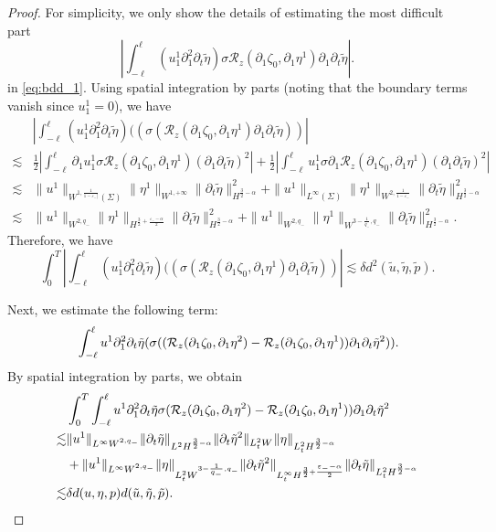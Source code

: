 \documentclass[letterpaper,reqno,10pt,twoside]{amsart}
\theoremstyle{definition}
\theoremstyle{remark}
\def\p{\partial}
\begin{document}
\begin{proof}
			\noindent For simplicity, we only show the details of estimating the most difficult part
			\[
			\left| \int_{-\ell}^{\ell}(u_{1}^{1}\p_{1}^{2}\p_{t}\tilde{\eta})\sigma\mathcal{R}_{z}(\p_{1}\zeta_{0},\p_{1}\eta^{1})\p_{1}\p_{t}\tilde{\eta} \right|.
			\]
			in \eqref{eq:bdd_1}.
			Using spatial integration by parts (noting that the boundary terms vanish since $u_{1}^{1}=0$), we have
			\[
			\begin{aligned}
				&| \int_{-\ell}^{\ell}(u_{1}^{1}\p_{1}^{2}\p_{t}\tilde{\eta})((\sigma(\mathcal{R}_{z}(\p_{1}\zeta_{0},\p_{1}\eta^{1})\p_{1}\p_{t}\tilde{\eta}))|\\
				\lesssim&\frac{1}{2}|\int_{-\ell}^{\ell}\p_{1}u_{1}^{1}\sigma\mathcal{R}_{z}(\p_{1}\zeta_{0},\p_{1}\eta^{1})(\p_{1}\p_{t}\tilde{\eta})^{2}|+\frac{1}{2}|\int_{-\ell}^{\ell}u_{1}^{1}\sigma\p_{1}\mathcal{R}_{z}(\p_{1}\zeta_{0},\p_{1}\eta^{1})(\p_{1}\p_{t}\tilde{\eta})^{2}|\\
				\lesssim&\|u^{1}\|_{W^{1,\frac{1}{1-\varepsilon_{-}]}}(\Sigma)}\|\eta^{1}\|_{W^{1,+\infty}}\|\p_{t}\tilde{\eta}\|_{H^{\frac{3}{2}-\alpha}}^{2}+\|u^{1}\|_{L^{\infty}(\Sigma)}\|\eta^{1}\|_{W^{2,\frac{1}{1-\varepsilon_{-}}}}\|\p_{t}\tilde{\eta}\|_{H^{\frac{3}{2}-\alpha}}^{2}\\
				\lesssim& \|u^{1}\|_{W^{2,q_{-}}}\|\eta^{1}\|_{H^{\frac{3}{2}+\frac{\varepsilon_{-}-\alpha}{2}}}\|\p_{t}\tilde{\eta}\|_{H^{\frac{3}{2}-\alpha}}^{2}+\|u^{1}\|_{W^{2,q_{-}}}\|\eta^{1}\|_{W^{3-\frac{1}{q_{-}},q_{-}}}\|\p_{t}\tilde{\eta}\|_{H^{\frac{3}{2}-\alpha}}^{2}.
			\end{aligned}
			\]
			\noindent Therefore, we have
			\[
			\int_{0}^{T} | \int_{-\ell}^{\ell}(u_{1}^{1}\p_{1}^{2}\p_{t}\tilde{\eta})((\sigma(\mathcal{R}_{z}(\p_{1}\zeta_{0},\p_{1}\eta^{1})\p_{1}\p_{t}\tilde{\eta}))|\lesssim \delta d^{2}(\tilde{u},\tilde{\eta},\tilde{p}).
			\]
			
			Next, we estimate the following term:
			\begin{align}{\label{eq:bdd_2}}
				\int_{-\ell}^{\ell}u^{1}\p_{1}^{2}\p_{t}\tilde{\eta}(\sigma ((\mathcal{R}_{z}(\p_{1}\zeta_{0},\p_{1}\eta^{2})-\mathcal{R}_{z}(\p_{1}\zeta_{0},\p_{1}\eta^{1}))\p_{1}\p_{t}\tilde{\eta}^{2})).
			\end{align}
			\noindent By spatial integration by parts, we obtain
			\begin{align}{\label{est:bdd_3}}
				&\int_{0}^{T}\int_{-\ell}^{\ell}u^{1}\p_{1}^{2}\p_{t}\tilde{\eta}\sigma (\mathcal{R}_{z}(\p_{1}\zeta_{0},\p_{1}\eta^{2})-\mathcal{R}_{z}(\p_{1}\zeta_{0},\p_{1}\eta^{1}))\p_{1}\p_{t}\tilde{\eta}^{2} \notag\\
				\lesssim& \|u^{1}\|_{L^{\infty}W^{2,q_{-}}}\|\p_{t}\tilde{\eta}\|_{L^{2}H^{\frac{3}{2}-\alpha}}\|\p_{t}\tilde{\eta}^{2}\|_{L_{t}^{2}W^{}}\|\eta\|_{L_{t}^{2}H^{\frac{3}{2}-\alpha}}\notag\\
				&+\|u^{1}\|_{L^{\infty}W^{2,q_{-}}}\|{\eta}\|_{L_{t}^{2}W^{3-\frac{1}{q_{-}},q_{-}}}\|\p_{t}\tilde{\eta}^{2}\|_{L_{t}^{\infty}H^{\frac{3}{2}+\frac{\varepsilon_{-}-\alpha}{2}}}\|\p_{t}\tilde{\eta}\|_{L_{t}^{2}H^{\frac{3}{2}-\alpha}}\notag\\
				\lesssim& \delta d(u,\eta,p)d(\tilde{u},\tilde{\eta},\tilde{p}).
			\end{align}
			

\end{proof}
\end{document}
